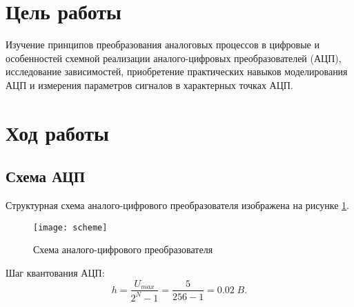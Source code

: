\documentclass[a4paper,14pt]{extarticle}
\begin{document}

\section{Цель работы}
Изучение принципов преобразования аналоговых процессов в цифровые
и особенностей схемной реализации аналого-цифровых преобразователей
(АЦП), исследование зависимостей, приобретение практических
навыков моделирования АЦП и измерения параметров сигналов в
характерных точках АЦП.

\section{Ход работы}
\subsection{Схема АЦП}
Структурная схема аналого-цифрового преобразователя изображена
на рисунке \ref{fig:scheme}.
\begin{figure}[H]
    \centering
    \texttt{[image: scheme]}
    \caption{Схема аналого-цифрового преобразователя}
    \label{fig:scheme}
\end{figure}

Шаг квантования АЦП:
\begin{equation}
    h = \frac{U_{max}}{2^N - 1} = \frac{5}{256 - 1} = 0.02 \; B. 
\end{equation}
\end{document}
